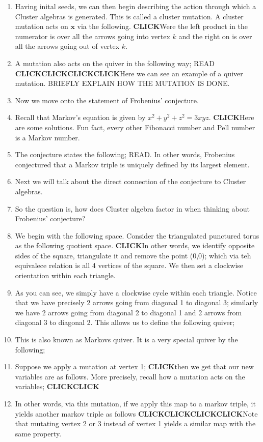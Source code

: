 \documentclass{article}
\newcommand{\click}{\textbf{CLICK}}
\begin{document}
\begin{enumerate}
    \item Having inital seeds, we can then begin describing the action through which a Cluster algebras is generated. This is called a cluster mutation. A cluster mutation acts on $\mathbf{x}$ via the following. \click Were the left product in the numerator is over all the arrows going into vertex $k$ and the right on is over all the arrows going out of vertex $k$. 
    \item A mutation also acts on the quiver in the following way; READ \click \click \click \click Here we can see an example of a quiver mutation. BRIEFLY EXPLAIN HOW THE MUTATION IS DONE.
    \item Now we move onto the statement of Frobenius' conjecture.
    \item Recall that Markov's equation is given by $x^2 + y^2 + z^2 = 3xyz$. \click Here are some solutions. Fun fact, every other Fibonacci number and Pell number is a Markov number.
    \item The conjecture states the following; READ. In other words, Frobenius conjectured that a Markov triple is uniquely defined by its largest element. 
    \item Next we will talk about the direct connection of the conjecture to Cluster algebras.
    \item So the question is, how does Cluster algebra factor in when thinking about Frobenius' conjecture?
    \item We begin with the following space. Consider the triangulated punctured torus as the following quotient space. \click  In other words, we identify opposite sides of the square, triangulate it and remove the point (0,0); which via teh equivalece relation is all 4 vertices of the square. We then set a clockwise orientation within each triangle.
    \item As you can see, we simply have a clockwise cycle within each triangle. Notice that we have precisely 2 arrows going from diagonal 1 to diagonal 3; similarly we have 2 arrows going from diagonal 2 to diagonal 1 and 2 arrows from diagonal 3 to diagonal 2. This allows us to define the following quiver;
    \item This is also known as Markovs quiver. It is a very special quiver by the following;
    \item Suppose we apply a mutation at vertex 1; \click then we get that our new variables are as follows. More precisely, recall how a mutation acts on the variables; \click \click 
    \item In other words, via this mutation, if we apply this map to a markov triple, it yields another markov triple as follows \click \click \click \click Note that mutating vertex 2 or 3 instead of vertex 1 yields a similar map with the same property. 

\end{enumerate}
\end{document}
